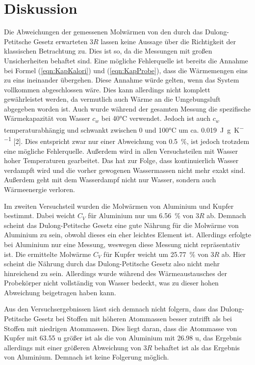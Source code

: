 \section{Diskussion}
\label{sec:Diskussion}

Die Abweichungen der gemessenen Molwärmen von den durch das Dulong-Petitsche 
Gesetz erwarteten $3R$ lassen keine Aussage über die Richtigkeit der 
klassischen Betrachtung zu. Dies ist so, da die Messungen mit großen
Unsicherheiten behaftet sind. Eine mögliche Fehlerquelle ist bereits
die Annahme bei Formel (\ref{eqn:KapKalori}) und (\ref{eqn:KapProbe}), 
dass die Wärmemengen eins zu eins ineinander übergehen. Diese Annahme 
würde gelten, wenn das System vollkommen abgeschlossen wäre. Dies kann
allerdings nicht komplett gewährleistet werden, da vermutlich auch Wärme an 
die Umgebungsluft abgegeben worden ist. 
Auch wurde während der gesamten Messung die spezifische Wärmekapazität 
von Wasser $c_w$ bei 40°C verwendet. Jedoch ist auch $c_w$ temperaturabhängig
und schwankt zwischen 0 und 100°C um ca. \SI{0.019}{\joule\per\gram\per\kelvin} [2].
Dies entspricht zwar nur einer Abweichung von \SI{0.5}{\percent}, ist jedoch
trotzdem eine mögliche Fehlerquelle.
Außerdem wird in allen Versuchsteilen mit Wasser hoher Temperaturen gearbeitet.
Das hat zur Folge, dass kontinuierlich Wasser verdampft wird und die vorher 
gewogenen Wassermassen nicht mehr exakt sind. Außerdem geht mit dem Wasserdampf 
nicht nur Wasser, sondern auch Wärmeenergie verloren. 

Im zweiten Versuchsteil wurden die Molwärmen von Aluminium und Kupfer bestimmt.
Dabei weicht $C_V$ für Aluminium nur um \SI{6.56}{\percent} von $3R$ ab. Demnach
scheint das Dulong-Petitsche Gesetz eine gute Nährung für die Molwärme
von Aluminium zu sein, obwohl dieses ein eher leichtes Element ist. Allerdings 
erfolgte bei Aluminium nur eine Messung, weswegen diese Messung nicht 
repräsentativ ist. 
Die ermittelte Molwärme $C_V$ für Kupfer weicht um \SI{25.77}{\percent} von $3R$ 
ab. Hier scheint die Nährung durch das Dulong-Petitsche Gesetz also nicht mehr 
hinreichend zu sein. 
Allerdings wurde während des Wärmeaustausches der Probekörper nicht vollständig
von Wasser bedeckt, was zu dieser hohen Abweichung beigetragen haben kann. 

Aus den Versuchsergebnissen lässt sich demnach nicht folgern, dass das 
Dulong-Petitsche Gesetz bei Stoffen mit höheren Atommassen besser zutrifft 
als bei Stoffen mit niedrigen Atommassen. Dies liegt daran, dass die Atommasse 
von Kupfer mit 63.55 u größer ist als die von Aluminium mit 26.98 u, 
das Ergebnis allerdings mit einer größeren Abweichung von $3R$ behaftet ist 
als das Ergebnis von Aluminium. 
Demnach ist keine Folgerung möglich.